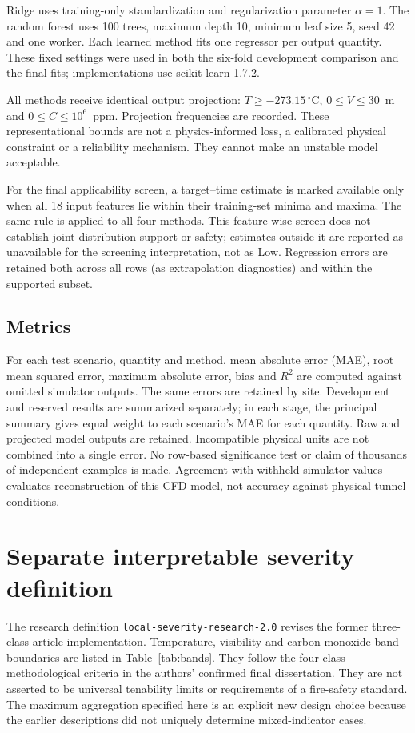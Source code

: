 \documentclass[preprint,12pt,authoryear]{elsarticle}
\begin{document}
Ridge uses training-only standardization and regularization parameter
$\alpha=1$. The random forest uses 100 trees, maximum depth 10, minimum
leaf size 5, seed 42 and one worker. Each learned method fits one regressor
per output quantity. These fixed settings were used in both the six-fold
development comparison and the final fits; implementations use
scikit-learn 1.7.2.

All methods receive identical output projection: $T\geq-273.15\,^{\circ}$C,
$0\leq V\leq30$~m and $0\leq C\leq10^6$~ppm. Projection frequencies
are recorded. These representational bounds are not a physics-informed
loss, a calibrated physical constraint or a reliability mechanism.
They cannot make an unstable model acceptable.

For the final applicability screen, a target--time estimate is marked
available only when all 18 input features lie within their training-set
minima and maxima. The same rule is applied to all four methods. This
feature-wise screen does not establish joint-distribution support or
safety; estimates outside it are reported as unavailable for the screening
interpretation, not as Low. Regression errors are retained both across all
rows (as extrapolation diagnostics) and within the supported subset.

\subsection{Metrics}
For each test scenario, quantity and method, mean absolute error (MAE),
root mean squared error, maximum absolute error, bias and $R^2$ are
computed against omitted simulator outputs. The same errors are retained
by site. Development and reserved results are summarized separately; in
each stage, the principal summary gives equal weight to each scenario's
MAE for each quantity. Raw and projected model outputs are retained.
Incompatible physical units are not combined into a single error. No
row-based significance test or claim of thousands of independent examples
is made. Agreement with withheld simulator values evaluates reconstruction
of this CFD model, not accuracy against physical tunnel conditions.

\section{Separate interpretable severity definition}
\label{sec:severity}
The research definition \texttt{local-severity-research-2.0} revises the
former three-class article implementation. Temperature, visibility and
carbon monoxide band boundaries are listed in Table~\ref{tab:bands}.
They follow the four-class methodological criteria in the authors'
confirmed final dissertation. They are not asserted to be universal
tenability limits or requirements of a fire-safety standard. The maximum
aggregation specified here is an explicit new design choice because the
earlier descriptions did not uniquely determine mixed-indicator cases.
\end{document}
